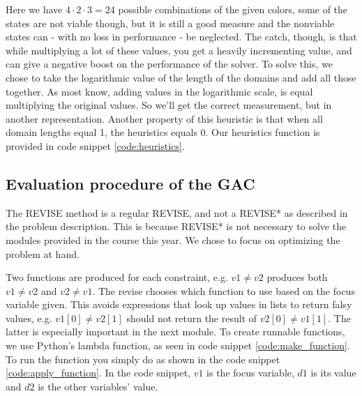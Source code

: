 Here we have \(4 \cdot 2 \cdot 3 = 24\) possible combinations of the given colors, some of the states are not viable though, but it is still a good measure and the nonviable states can - with no loss in performance - be neglected. The catch, though, is that while multiplying a lot of these values, you get a heavily incrementing value, and can give a negative boost on the performance of the solver. To solve this, we chose to take the logarithmic value of the length of the domains and add all those together. As most know, adding values in the logarithmic scale, is equal multiplying the original values. So we'll get the correct measurement, but in another representation. Another property of this heuristic is that when all domain lengths equal 1, the heuristics equals 0. Our heuristics function is provided in code snippet \ref{code:heuristics}.



\subsection{Evaluation procedure of the GAC}
The REVISE method is a regular REVISE, and not a REVISE* as described in the problem description. This is because REVISE* is not necessary to solve the modules provided in the course this year. We chose to focus on optimizing the problem at hand.



Two functions are produced for each constraint, e.g. \( v1 \neq v2 \) produces both \(v1 \neq v2 \) and \(v2 \neq v1 \). The revise chooses which function to use based on the focus variable given. This avoids expressions that look up values in lists to return falsy values, e.g. \( v1[0] \neq v2[1] \) should not return the result of \( v2[0] \neq v1[1] \). The latter is especially important in the next module. To create runnable functions, we use Python's lambda function, as seen in code snippet \ref{code:make_function}. To run the function you simply do as shown in the code snippet \ref{code:apply_function}. In the code snippet, \(v1\) is the focus variable, \(d1\) is its value and \(d2\) is the other variables' value.

